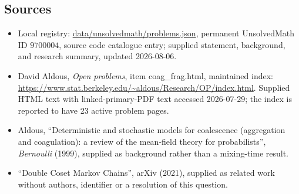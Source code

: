 \documentclass[11pt]{article}
\begin{document}
\subsection{Sources}
\begin{itemize}
\item Local registry: \url{data/unsolvedmath/problems.json}, permanent UnsolvedMath ID \(9700004\), source code catalogue entry; supplied statement, background, and research summary, updated 2026-08-06.
\item David Aldous, \emph{Open problems}, item coag\_frag.html, maintained index: \url{https://www.stat.berkeley.edu/~aldous/Research/OP/index.html}. Supplied HTML text with linked-primary-PDF text accessed 2026-07-29; the index is reported to have 23 active problem pages.
\item Aldous, ``Deterministic and stochastic models for coalescence (aggregation and coagulation): a review of the mean-field theory for probabilists'', \emph{Bernoulli} (1999), supplied as background rather than a mixing-time result.
\item ``Double Coset Markov Chains'', arXiv (2021), supplied as related work without authors, identifier or a resolution of this question.
\end{itemize}
\end{document}
